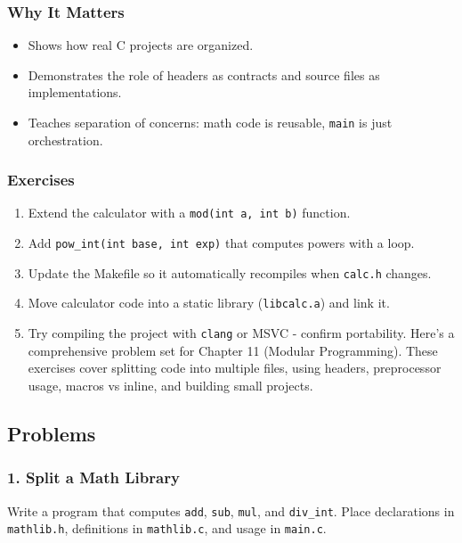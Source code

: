 \documentclass[
  letterpaper,
  DIV=11,
  numbers=noendperiod]{scrreprt}
\providecommand{\tightlist}{%
  \setlength{\itemsep}{0pt}\setlength{\parskip}{0pt}}
\begin{document}
\subsubsection{Why It Matters}\label{why-it-matters-50}

\begin{itemize}
\tightlist
\item
  Shows how real C projects are organized.
\item
  Demonstrates the role of headers as contracts and source files as
  implementations.
\item
  Teaches separation of concerns: math code is reusable, \texttt{main}
  is just orchestration.
\end{itemize}

\subsubsection{Exercises}\label{exercises-54}

\begin{enumerate}
\def\labelenumi{\arabic{enumi}.}
\tightlist
\item
  Extend the calculator with a \texttt{mod(int\ a,\ int\ b)} function.
\item
  Add \texttt{pow\_int(int\ base,\ int\ exp)} that computes powers with
  a loop.
\item
  Update the Makefile so it automatically recompiles when
  \texttt{calc.h} changes.
\item
  Move calculator code into a static library (\texttt{libcalc.a}) and
  link it.
\item
  Try compiling the project with \texttt{clang} or MSVC - confirm
  portability. Here's a comprehensive problem set for Chapter 11
  (Modular Programming). These exercises cover splitting code into
  multiple files, using headers, preprocessor usage, macros vs inline,
  and building small projects.
\end{enumerate}

\subsection{Problems}\label{problems-9}

\subsubsection{1. Split a Math Library}\label{split-a-math-library}

Write a program that computes \texttt{add}, \texttt{sub}, \texttt{mul},
and \texttt{div\_int}. Place declarations in \texttt{mathlib.h},
definitions in \texttt{mathlib.c}, and usage in \texttt{main.c}.
\end{document}
